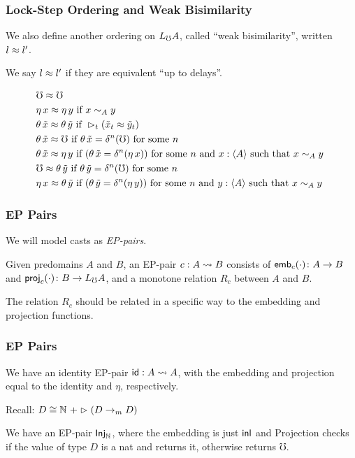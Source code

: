 \documentclass[
	11pt, %
]{beamer}
\begin{document}
\begin{frame}
	\frametitle{Lock-Step Ordering and Weak Bisimilarity}

	We also define another ordering on $L_\mho A$, called ``weak bisimilarity'',
	written $l \approx l'$.

	We say $l \approx l'$ if they are equivalent ``up to delays''.

	\begin{align*}
		&\mho \bisim \mho \\
%
		&\eta\, x \bisim \eta\, y \text{ if } 
		  x \sim_A y \\
%		
		&\theta\, \tilde{x} \bisim \theta\, \tilde{y} \text{ if } 
		  \later_t (\tilde{x}_t \bisim \tilde{y}_t) \\
%	
		&\theta\, \tilde{x} \bisim \mho \text{ if } 
		  \theta\, \tilde{x} = \delta^n(\mho) \text { for some $n$ } \\
%	
		&\theta\, \tilde{x} \bisim \eta\, y \text{ if }
		  (\theta\, \tilde{x} = \delta^n(\eta\, x))
		\text { for some $n$ and $x : \ty{A}$ such that $x \sim_A y$ } \\
%
		&\mho \bisim \theta\, \tilde{y} \text { if } 
		  \theta\, \tilde{y} = \delta^n(\mho) \text { for some $n$ } \\
%	
		&\eta\, x \bisim \theta\, \tilde{y} \text { if }
		  (\theta\, \tilde{y} = \delta^n (\eta\, y))
		\text { for some $n$ and $y : \ty{A}$ such that $x \sim_A y$ }
	\end{align*}

	
\end{frame}

\begin{frame}
	\frametitle{EP Pairs}

	We will model casts as \emph{EP-pairs}.

	\bigskip
	
	Given predomains $A$ and $B$, an EP-pair $c : A \leadsto B$ consists of $\mathsf{emb}_{c}({\cdot}) \colon A \to B$ and $\mathsf{proj}_{c}({\cdot}) \colon B \to L_\mho A$, and a monotone relation $R_c$ between $A$ and $B$.

	\medskip

	The relation $R_c$ should be related in a specific way to the embedding and projection functions.


\end{frame}

\begin{frame}
	\frametitle{EP Pairs}

	We have an identity EP-pair $\mathsf{id} : A \leadsto A$, with the embedding and projection equal to the identity and $\eta$, respectively.

	\medskip

	Recall: $D \cong \mathbb{N}\,\, + \vartriangleright(D \to_m D)$

	\medskip

	We have an EP-pair $\textsf{Inj}_\mathbb{N}$, where the embedding is just $\mathsf{inl}$ and
	Projection checks if the value of type $D$ is a nat and returns it, otherwise returns $\mho$.

\end{frame}
\end{document}
